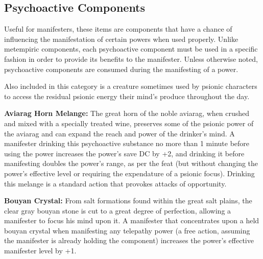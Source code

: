 \subsection{Psychoactive Components}

Useful for manifesters, these items are components that have a chance of influencing the manifestation of certain powers when used properly. Unlike metempiric components, each psychoactive component must be used in a specific fashion in order to provide its benefits to the manifester. Unless otherwise noted, psychoactive components are consumed during the manifesting of a power.

Also included in this category is a creature sometimes used by psionic characters to access the residual psionic energy their mind's produce throughout the day.


\textbf{Aviarag Horn Melange:} The great horn of the noble aviarag, when crushed and mixed with a specially treated wine, preserves some of the psionic power of the aviarag and can expand the reach and power of the drinker's mind. A manifester drinking this psychoactive substance no more than 1 minute before using the  power increases the power's save DC by +2, and drinking it before manifesting  doubles the power's range, as per the  feat (but without changing the power's effective level or requiring the expendature of a psionic focus). Drinking this melange is a standard action that provokes attacks of opportunity.

\textbf{Bouyan Crystal:} From salt formations found within the great salt plains, the clear gray bouyan stone is cut to a great degree of perfection, allowing a manifester to focus his mind upon it. A manifester that concentrates upon a held bouyan crystal when manifesting any telepathy power (a free action, assuming the manifester is already holding the component) increases the power's effective manifester level by +1.

